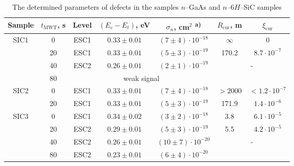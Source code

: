 \documentclass[final,3p,times,twocolumn,authoryear]{elsarticle}
\begin{document}

\begin{table}
\caption{\label{tabMW}The determined parameters of defects in the samples $n$--GaAs and $n$--6$H$--SiC samples
}
\center
\begin{tabular}{ccccccc}
\hline
Sample& $t_\mathrm{MWT}$, s &Level &$(E_c-E_t)$, eV &$\sigma_n$, cm$^2$\textsuperscript{ a)}&$R_\mathrm{cur}$, m&$\xi_\mathrm{cur}$\\
\hline
SIC1& 0 &ESC1& $0.33\pm0.01$ &$(7\pm4)\cdot10^{-18}$&$\infty$&0\\ %
& 20 &ESC1& $0.33\pm0.01$ &$(5\pm3)\cdot10^{-19}$&170.2&$8.7\cdot10^{-7}$\\ %
& 40 &ESC2& $0.26\pm0.01$ &$(2\pm1)\cdot10^{-19}$&\multicolumn{2}{c}{\multirow{2}{*}{-}}\\ %
& 80 & \multicolumn{3}{c}{weak signal}&\multicolumn{2}{c}{}\\ %
SIC2& 0 &ESC1& $0.33\pm0.01$ &$(7\pm4)\cdot10^{-18}$&$>2000$&$<1.2\cdot10^{-7}$\\ %
& 20 &ESC1& $0.33\pm0.01$ &$(5\pm3)\cdot10^{-19}$&171.9&$1.4\cdot10^{-6}$\\ %
SIC3& 0 &ESC1& $0.34\pm0.02$ &$(3\pm2)\cdot10^{-18}$&3.8&$6.1\cdot10^{-5}$\\ %
& 20 &ESC2&$0.29\pm0.01$ &$(5\pm3)\cdot10^{-19}$&5.5&$4.2\cdot10^{-5}$\\ %
& 40 &ESC2& $0.26\pm0.01$ &$(10\pm7)\cdot10^{-20}$&\multicolumn{2}{c}{\multirow{2}{*}{-}}\\ %
& 80 &ESC2& $0.23\pm0.01$ &$(6\pm4)\cdot10^{-20}$&\multicolumn{2}{c}{}\\ %

\end{tabular}
\end{table}
\end{document}
